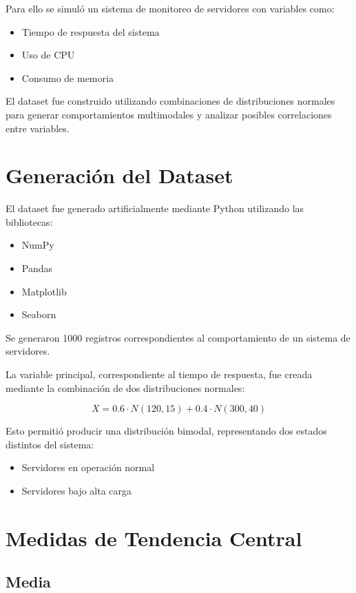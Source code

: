 \documentclass[12pt]{article}
\begin{document}
Para ello se simuló un sistema de monitoreo de servidores con variables como:

\begin{itemize}
    \item Tiempo de respuesta del sistema
    \item Uso de CPU
    \item Consumo de memoria
\end{itemize}

El dataset fue construido utilizando combinaciones de distribuciones normales
para generar comportamientos multimodales y analizar posibles correlaciones
entre variables.

\section{Generación del Dataset}

El dataset fue generado artificialmente mediante Python utilizando las
bibliotecas:

\begin{itemize}
    \item NumPy
    \item Pandas
    \item Matplotlib
    \item Seaborn
\end{itemize}

Se generaron 1000 registros correspondientes al comportamiento de un sistema
de servidores.

La variable principal, correspondiente al tiempo de respuesta, fue creada
mediante la combinación de dos distribuciones normales:

\[
X = 0.6 \cdot N(120,15) + 0.4 \cdot N(300,40)
\]

Esto permitió producir una distribución bimodal, representando dos estados
distintos del sistema:

\begin{itemize}
    \item Servidores en operación normal
    \item Servidores bajo alta carga
\end{itemize}


\section{Medidas de Tendencia Central}

\subsection{Media}
\end{document}
